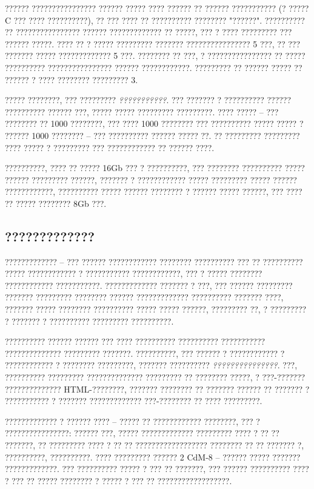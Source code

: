 ?????? ???????????????? ?????? ????? ???? ?????? ?? ?????? ??????????? (? ????? C ??? ???? ??????????), ?? ??? ???? ?? ?????????? ???????? "??????".  ?????????? ?? ???????????????? ?????? ????????????? ?? ?????, ??? ? ???? ????????? ??? ?????? ?????.  ???? ?? ? ????? ????????? ??????? ???????????????? 5 ???, ?? ??? ??????? ????? ????????????? 5 ???.  ???????? ?? ???, ? ???????????????? ?? ????? ?????????? ???????????????? ?????? ????????????.  ????????? ?? ?????? ????? ?? ?????? ? ???? ???????? ????????? 3.   

????? ????????, ??? ????????? \emph{???????????}.  ??? ??????? ? ?????????? ?????? ?????????? ?????? ???, ????? ????? ????????? ?????????.   ???? ????? -- ??? ???????? ?? 1000 ????????, ??? ???? 1000 ???????? ??? ?????????? ????? ????? ? ?????? 1000 ????????  -- ??? ?????????? ?????? ????? ??.  ?? ????????? ????????? ???? ????? ? ????????? ??? ???????????? ?? ?????? ????.

??????????, ???? ?? ????? 16Gb ??? ? ??????????, ??? ???????? ?????????? ????? ?????? ????????? ??????, ??????? ? ???????????? ????? ????????? ????? ?????? ????????????, ?????????? ????? ?????? ???????? ? ?????? ????? ??????, ??? ???? ?? ????? ???????? 8Gb ???.

\subsection{?????????????}

????????????? -- ??? ?????? ???????????? ???????? ?????????? ??? ?? ?????????? ????? ???????????? ? ??????????? ????????????, ??? ? ????? ???????? ???????????? ???????????.   ????????????? ??????? ? ???, ??? ?????? ????????? ??????? ????????? ???????? ?????? ????????????? ?????????? ??????? ????, ??????? ????? ???????? ?????????? ????? ????? ??????, ????????? ??, ? ????????? ? ??????? ? ?????????? ????????? ??????????.  

?????????? ?????? ?????? ??? ???? ?????????? ?????????? ??????????? ?????????????? ????????? ???????.  ??????????, ??? ?????? ? ???????????? ? ???????????? ? ???????? ?????????, ??????? ?????????? \emph{???????????????}.  ???, ?????????? ????????? ?????????????? ????????? ?? ???????? ?????, ? ???-??????? ?????????????? HTML-????????, ??????? ???????? ?? ??????? ?????? ?? ??????? ? ??????????? ? ??????? ????????????? ???-???????? ?? ???? ?????????.  

????????????? ? ?????? ???? -- ????? ?? ???????????? ????????, ??? ? ????????????????: ?????? ???, ????? ????????????? ????????? ???? ? ?? ?? ???????, ?? ????????? ???? ? ?? ?? ?????????????????? ???????? ?? ?? ??????? ?, ??????????, ??????????.  ???? ????????? ?????? 2 CdM-8 -- ?????? ????? ??????? ?????????????.  ??? ?????????? ????? ? ??? ?? ???????, ??? ?????? ?????????? ???? ? ??? ?? ????? ???????? ? ????? ? ??? ?? ??????????????????.

